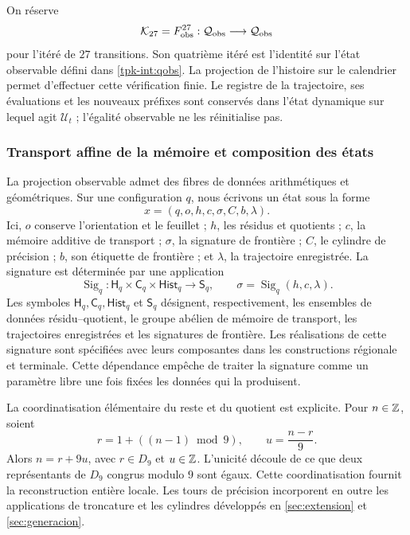 On réserve
\[
 \mathcal K_{27}=F_{\rm obs}^{27}:
 \mathcal Q_{\rm obs}\longrightarrow\mathcal Q_{\rm obs}
\]
pour l'itéré de \(27\) transitions. Son quatrième itéré est l'identité sur l'état observable défini dans \eqref{tpk-int:qobs}. La projection de l'histoire sur le calendrier permet d'effectuer cette vérification finie. Le registre de la trajectoire, ses évaluations et les nouveaux préfixes sont conservés dans l'état dynamique sur lequel agit \(\mathcal U_t\) ; l'égalité observable ne les réinitialise pas.

\subsubsection{Transport affine de la mémoire et composition des états}
\label{tpk-int:memoria}

La projection observable admet des fibres de données arithmétiques et géométriques.
Sur une configuration \(q\), nous écrivons un état sous la forme
\[
 x=(q,o,h,c,\sigma,C,b,\lambda).
\]
Ici, \(o\) conserve l'orientation et le feuillet ; \(h\), les résidus
et quotients ; \(c\), la mémoire additive de transport ; \(\sigma\),
la signature de frontière ; \(C\), le cylindre de précision ; \(b\), son
étiquette de frontière ; et \(\lambda\), la trajectoire enregistrée. La
signature est déterminée par une application
\[
 \operatorname{Sig}_q:
 \mathsf H_q\times\mathsf C_q\times\mathsf{Hist}_q
 \longrightarrow\mathsf S_q,
 \qquad \sigma=\operatorname{Sig}_q(h,c,\lambda).
\]
Les symboles \(\mathsf H_q,\mathsf C_q,\mathsf{Hist}_q\) et
\(\mathsf S_q\) désignent, respectivement, les ensembles de données
résidu--quotient, le groupe abélien de mémoire de transport, les
trajectoires enregistrées et les signatures de frontière.
Les réalisations de cette signature sont spécifiées avec leurs composantes dans
les constructions régionale et terminale. Cette dépendance empêche de traiter
la signature comme un paramètre libre une fois fixées les données qui la produisent.

La coordinatisation élémentaire du reste et du quotient est explicite. Pour
\(n\in\mathbb Z\), soient
\[
 r=1+((n-1)\bmod9),\qquad u=\frac{n-r}{9}.
\]
Alors \(n=r+9u\), avec \(r\in D_9\) et \(u\in\mathbb Z\).
L'unicité découle de ce que deux représentants de \(D_9\) congrus
modulo \(9\) sont égaux. Cette coordinatisation fournit la reconstruction
entière locale. Les tours de précision incorporent en outre les applications
de troncature et les cylindres développés en
\ref{sec:extension} et \ref{sec:generacion}.

